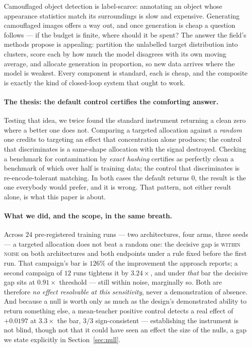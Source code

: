 \documentclass{article} %
\begin{document}
Camouflaged object detection is label-scarce: annotating an object whose appearance statistics match
its surroundings is slow and expensive. Generating camouflaged images offers a way out, and once
generation is cheap a question follows --- if the budget is finite, where should it be spent? The
answer the field's methods propose is appealing: partition the unlabelled target distribution into
clusters, score each by how much the model disagrees with its own moving average, and allocate
generation in proportion, so new data arrives where the model is weakest. Every component is standard,
each is cheap, and the composite is exactly the kind of closed-loop system that ought to work.

\paragraph{The thesis: the default control certifies the comforting answer.} Testing that idea, we
twice found the standard instrument returning a clean zero where a better one does not. Comparing a
targeted allocation against a \emph{random} one credits to targeting an effect that concentration
alone produces; the control that discriminates is a same-shape allocation with the signal destroyed.
Checking a benchmark for contamination by \emph{exact hashing} certifies as perfectly clean a
benchmark of which over half is training data; the control that discriminates is re-encode-tolerant
matching. In both cases the default returns $0$, the result is the one everybody would prefer, and it
is wrong. That pattern, not either result alone, is what this paper is about.

\paragraph{What we did, and the scope, in the same breath.} Across $24$ pre-registered training runs
--- two architectures, four arms, three seeds --- a targeted allocation does not beat a random one:
the decisive gap is \textsc{within noise} on both architectures and both endpoints under a rule fixed
before the first run. That campaign's bar is $126\%$ of the improvement the approach reports; a second
campaign of $12$ runs tightens it by $3.24\times$, and under \emph{that} bar the decisive gap sits at
$0.91\times$ threshold --- still within noise, marginally so. Both are therefore \emph{no effect
resolvable at this sensitivity}, never a demonstration of absence. And because a null is worth only as
much as the design's demonstrated ability to return something else, a mean-teacher positive control
detects a real effect of $+0.0197$ at $3.3\times$ the bar, $3/3$ sign-consistent --- establishing the
instrument is not blind, though not that it could have seen an effect the size of the nulls, a gap we
state explicitly in Section~\ref{sec:null}.
\end{document}

